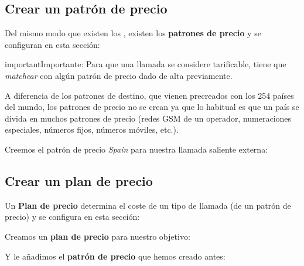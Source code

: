 \documentclass[letterpaper,10pt,spanish]{sphinxmanual}
\begin{document}
\subsection{Crear un patrón de precio}
\label{external_outgoing_calls/noplan_nocall:crear-un-patron-de-precio}\label{external_outgoing_calls/noplan_nocall:price-pattern}
Del mismo modo que existen los {\hyperref[external_outgoing_calls/call_types:target\string-patterns]{}}, existen los \textbf{patrones de precio} y se configuran en esta sección:

\noindent{}

\begin{notice}{important}{Importante:}
Para que una llamada se considere tarificable, tiene que \emph{matchear} con algún patrón de precio dado de alta previamente.
\end{notice}

A diferencia de los patrones de destino, que vienen precreados con los 254 países del mundo, los patrones de precio no se crean ya que lo habitual es que un país se divida en muchos patrones de precio (redes GSM de un operador, numeraciones especiales, números fijos, números móviles, etc.).

Creemos el patrón de precio \emph{Spain} para nuestra llamada saliente externa:

\noindent{}


\subsection{Crear un plan de precio}
\label{external_outgoing_calls/noplan_nocall:price-plan}\label{external_outgoing_calls/noplan_nocall:crear-un-plan-de-precio}
Un \textbf{Plan de precio} determina el coste de un tipo de llamada (de un patrón de precio) y se configura en esta sección:

\noindent{}

Creamos un \textbf{plan de precio} para nuestro objetivo:

\noindent{}

Y le añadimos el \textbf{patrón de precio} que hemos creado antes:

\noindent{}

\noindent{}
\end{document}

